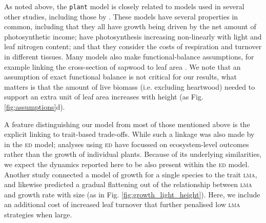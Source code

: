 \documentclass[9pt,twocolumn,twoside,lineno]{pnas-new}
\newcommand{\plant}{\texttt{plant}}
\newcommand{\lma}{\textsc{lma}}
\begin{document}
As noted above, the {\plant} model is closely related to models used in several other studies, including those by \citep{Givnish-1988, Yokozawa-1995, Makela-1997, King-1999, King-2005, Moorcroft-2001, Li-2014}. These models have several properties in common, including that they all have growth being driven by the net amount of photosynthetic income; have photosynthesis increasing non-linearly with light and leaf nitrogen content; and that they consider the costs of respiration and turnover in different tissues. Many models also make functional-balance assumptions, for example linking the cross-section of sapwood to leaf area \citep{Givnish-1988, Yokozawa-1995, Makela-1997, King-2005, Moorcroft-2001}. We note that an assumption of exact functional balance is not critical for our results, what matters is that the amount of live biomass (i.e. excluding heartwood) needed to support an extra unit of leaf area increases with height (as Fig. \ref{fig:assumptions}d).

A feature distinguishing our model from most of those mentioned above is the explicit linking to trait-based trade-offs. While such a linkage was also made by \citep{Moorcroft-2001} in the \textsc{ed} model; analyses using \textsc{ed} have focussed on ecosystem-level outcomes rather than the growth of individual plants. Because of its underlying similarities, we expect the dynamics reported here to be also present within the \textsc{ed} model. Another study \citep{King-1999} connected a model of growth for a single species to the trait {\lma}, and likewise predicted a gradual flattening out of the relationship between {\lma} and growth rate with size (as in Fig. \ref{fig:growth_light_height}). Here, we include an additional cost of increased leaf turnover that further penalised low {\lma} strategies when large.
\end{document}
